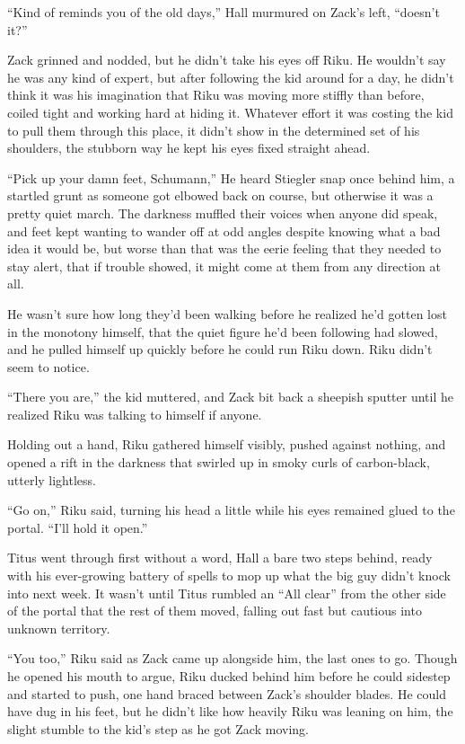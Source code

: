 ``Kind of reminds you of the old days,'' Hall murmured on Zack's left, ``doesn't it?''

Zack grinned and nodded, but he didn't take his eyes off Riku. He wouldn't say he was any kind of expert, but after following the kid around for a day, he didn't think it was his imagination that Riku was moving more stiffly than before, coiled tight and working hard at hiding it. Whatever effort it was costing the kid to pull them through this place, it didn't show in the determined set of his shoulders, the stubborn way he kept his eyes fixed straight ahead.

``Pick up your damn feet, Schumann,'' He heard Stiegler snap once behind him, a startled grunt as someone got elbowed back on course, but otherwise it was a pretty quiet march. The darkness muffled their voices when anyone did speak, and feet kept wanting to wander off at odd angles despite knowing what a bad idea it would be, but worse than that was the eerie feeling that they needed to stay alert, that if trouble showed, it might come at them from any direction at all.

He wasn't sure how long they'd been walking before he realized he'd gotten lost in the monotony himself, that the quiet figure he'd been following had slowed, and he pulled himself up quickly before he could run Riku down. Riku didn't seem to notice.

``There you are,'' the kid muttered, and Zack bit back a sheepish sputter until he realized Riku was talking to himself if anyone.

Holding out a hand, Riku gathered himself visibly, pushed against nothing, and opened a rift in the darkness that swirled up in smoky curls of carbon-black, utterly lightless.

``Go on,'' Riku said, turning his head a little while his eyes remained glued to the portal. ``I'll hold it open.''

Titus went through first without a word, Hall a bare two steps behind, ready with his ever-growing battery of spells to mop up what the big guy didn't knock into next week. It wasn't until Titus rumbled an ``All clear'' from the other side of the portal that the rest of them moved, falling out fast but cautious into unknown territory.

``You too,'' Riku said as Zack came up alongside him, the last ones to go. Though he opened his mouth to argue, Riku ducked behind him before he could sidestep and started to push, one hand braced between Zack's shoulder blades. He could have dug in his feet, but he didn't like how heavily Riku was leaning on him, the slight stumble to the kid's step as he got Zack moving.

